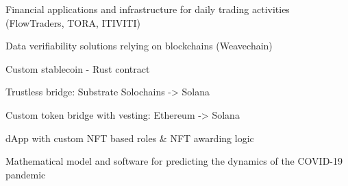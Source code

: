 

\vspace{2mm}
  \begin{cvitems} %
    \item {Financial applications and infrastructure for daily trading activities (FlowTraders, TORA, ITIVITI)}
    \item {Data verifiability solutions relying on blockchains (Weavechain)}
    \item {Custom stablecoin - Rust contract}
    \item {Trustless bridge: Substrate Solochains -> Solana}
    \item {Custom token bridge with vesting: Ethereum -> Solana}
    \item {dApp with custom NFT based roles \& NFT awarding logic}
    \item {Mathematical model and software for predicting the dynamics of the COVID-19 pandemic}
  \end{cvitems}
  \vspace{2mm}